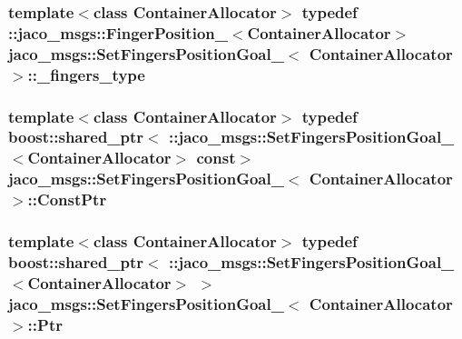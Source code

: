 \subsubsection[{\texorpdfstring{\+\_\+fingers\+\_\+type}{_fingers_type}}]{\setlength{\rightskip}{0pt plus 5cm}template$<$class Container\+Allocator$>$ typedef \+::{\bf jaco\+\_\+msgs\+::\+Finger\+Position\+\_\+}$<$Container\+Allocator$>$ {\bf jaco\+\_\+msgs\+::\+Set\+Fingers\+Position\+Goal\+\_\+}$<$ Container\+Allocator $>$\+::{\bf \+\_\+fingers\+\_\+type}}\hypertarget{structjaco__msgs_1_1SetFingersPositionGoal___abb2ddc1ec460839d7bcbc60fec63f463}{}\label{structjaco__msgs_1_1SetFingersPositionGoal___abb2ddc1ec460839d7bcbc60fec63f463}
\subsubsection[{\texorpdfstring{Const\+Ptr}{ConstPtr}}]{\setlength{\rightskip}{0pt plus 5cm}template$<$class Container\+Allocator$>$ typedef boost\+::shared\+\_\+ptr$<$ \+::{\bf jaco\+\_\+msgs\+::\+Set\+Fingers\+Position\+Goal\+\_\+}$<$Container\+Allocator$>$ const$>$ {\bf jaco\+\_\+msgs\+::\+Set\+Fingers\+Position\+Goal\+\_\+}$<$ Container\+Allocator $>$\+::{\bf Const\+Ptr}}\hypertarget{structjaco__msgs_1_1SetFingersPositionGoal___a8bb24530dbb610aea679ddf6e7d7b08f}{}\label{structjaco__msgs_1_1SetFingersPositionGoal___a8bb24530dbb610aea679ddf6e7d7b08f}
\subsubsection[{\texorpdfstring{Ptr}{Ptr}}]{\setlength{\rightskip}{0pt plus 5cm}template$<$class Container\+Allocator$>$ typedef boost\+::shared\+\_\+ptr$<$ \+::{\bf jaco\+\_\+msgs\+::\+Set\+Fingers\+Position\+Goal\+\_\+}$<$Container\+Allocator$>$ $>$ {\bf jaco\+\_\+msgs\+::\+Set\+Fingers\+Position\+Goal\+\_\+}$<$ Container\+Allocator $>$\+::{\bf Ptr}}\hypertarget{structjaco__msgs_1_1SetFingersPositionGoal___a2d4e883221fd33df8b2f229e8f7764fe}{}\label{structjaco__msgs_1_1SetFingersPositionGoal___a2d4e883221fd33df8b2f229e8f7764fe}
